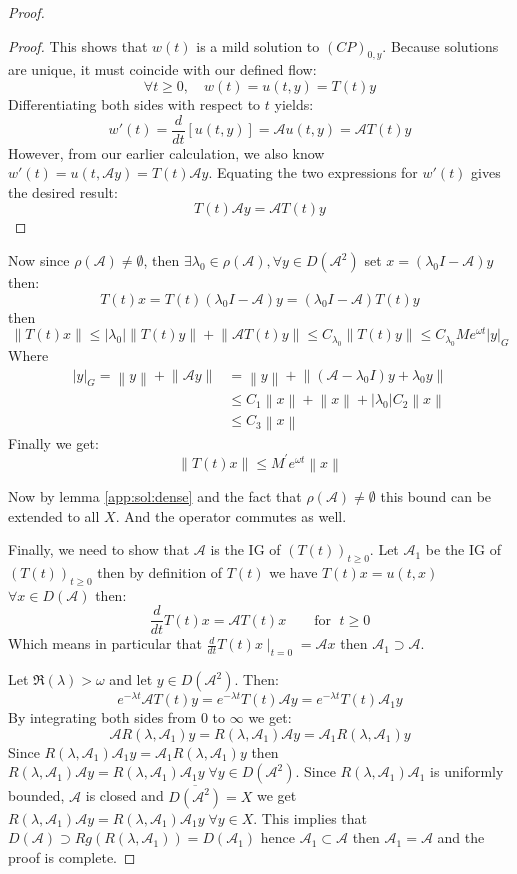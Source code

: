 \documentclass[12pt, oneside]{book}
\newcommand{\norm}[1]{\left\lVert#1\right\rVert}
\newcommand{\A}{\mathscr{A}}
\begin{document}
\begin{proof}
\begin{proof}
    This shows that $w(t)$ is a mild solution to $(CP)_{0,y}$. Because solutions are unique, it must coincide with our defined flow:
    $$ \forall t \ge 0, \quad w(t) = u(t,y) = T(t)y $$
    Differentiating both sides with respect to $t$ yields:
    $$ w'(t) = \frac{d}{dt} [u(t,y)] = \A u(t,y) = \A T(t)y $$
    However, from our earlier calculation, we also know $w'(t) = u(t, \A y) = T(t)\A y$. Equating the two expressions for $w'(t)$ gives the desired result:
    $$ T(t)\A y = \A T(t)y $$
\end{proof}

Now since $\rho(\A) \neq \emptyset$, then $\exists \lambda_0 \in \rho(\A), \forall y \in D(\A^2)$ set $x = (\lambda_0 I - \A)y$ then:
$$
T(t)x = T(t)(\lambda_0 I - \A)y = (\lambda_0 I - \A)T(t)y
$$
then
$$
\norm{T(t)x} \le |\lambda_0| \norm{T(t)y} + \norm{\A T(t)y} \le C_{\lambda_0} \norm{T(t)y} \le C_{\lambda_0} M e^{\omega t} |y|_G
$$
Where
\begin{align*}
	|y|_G = \norm{y} + \norm{\A y} &= \norm{y} + \norm{(\A -\lambda_0 I)y + \lambda_0 y} \\
				       &\le C_1 \norm{x} + \norm{x} + |\lambda_0| C_2 \norm{x} \\
				       &\le C_3 \norm{x}
\end{align*}
Finally we get:
$$
\norm{T(t)x} \le M^{'} e^{\omega t} \norm{x}
$$

Now by lemma \ref{app:sol:dense} and the fact that $\rho(\A) \neq \emptyset$ this bound can be extended to all $X$. And the operator commutes as well.

Finally, we need to show that $\A$ is the IG of $\left(T(t)\right)_{t \ge 0}$. Let $\A_1$ be the IG of $\left(T(t)\right)_{t \ge 0}$ then by definition of $T(t)$ we have $T(t)x = u(t, x)$ $\forall x \in D(\A)$ then:
$$
\frac{d}{dt} T(t)x = \A T(t)x \quad\quad \text{for } \; t \ge 0
$$
Which means in particular that $\frac{d}{dt} T(t)x\mid_{t = 0} = \A x$ then $\A_1 \supset \A$.

Let $\Re(\lambda) > \omega$ and let $y \in D(\A^2)$. Then:
$$
e^{-\lambda t} \A T(t) y = e^{-\lambda t} T(t) \A y = e^{-\lambda t} T(t) \A_1 y
$$
By integrating both sides from $0$ to $\infty$ we get:
$$
\A R(\lambda, \A_1) y = R(\lambda, \A_1) \A y = \A_1 R(\lambda, \A_1) y
$$
Since $R(\lambda, \A_1) \A_1 y = \A_1 R(\lambda, \A_1) y$ then $R(\lambda, \A_1) \A y = R(\lambda, \A_1) \A_1 y \; \forall y \in D(\A^2)$. Since $R(\lambda, \A_1) \A_1$ is uniformly bounded, $\A$ is closed and $\overline{D(\A^2)} = X$ we get $R(\lambda, \A_1) \A y = R(\lambda, \A_1) \A_1 y \; \forall y \in X$. This implies that $D(\A) \supset Rg(R(\lambda, \A_1)) = D(\A_1)$ hence $\A_1 \subset \A$ then $\A_1 = \A$ and the proof is complete.
\end{proof}
\end{document}
